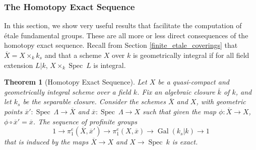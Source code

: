 \documentclass{article}
\theoremstyle{plain}
\newtheorem{theorem}{Theorem}[subsection]
\theoremstyle{definition}
\DeclareMathOperator{\Spec}{Spec}
\DeclareMathOperator{\Gal}{Gal}
\begin{document}
\subsubsection{The Homotopy Exact Sequence}

In this section, we show very useful results that facilitate the computation of \'etale fundamental groups.
These are all more or less direct consequences of the homotopy exact sequence.
Recall from Section \ref{finite_etale_coverings} that $\overline{X}= X\times_kk_s$ and that a scheme $X$ over $k$ is geometrically integral if for all field extension $L|k$, $X\times_k\Spec\: L$ is integral.

\begin{theorem}[Homotopy Exact Sequence]
\label{first_homotopy_exact_sequence}
    Let $X$ be a quasi-compact and geometrically integral scheme over a field $k$. 
    Fix an algebraic closure $\overline{k}$ of $k$, and let $k_s$ be the separable closure.
    Consider the schemes $\overline{X}$ and $X$, with geometric points $\overline{x}':\Spec\:\Lambda \rightarrow \overline{X}$ and $\overline{x}:\Spec\:\Lambda\rightarrow X$ such that given the map $\phi:\overline{X}\rightarrow X$, $\phi\circ \overline{x}'=\overline{x}$.
    The sequence of profinite groups 
    $$1\rightarrow \pi^e_1(\overline{X},\overline{x}') \rightarrow \pi^e_1(X,\overline{x})\rightarrow \Gal(k_s|k)\rightarrow 1$$
    that is induced by the maps $\overline{X}\rightarrow X$ and $X\rightarrow \Spec\:k$ is exact.
\end{theorem}
\end{document}
